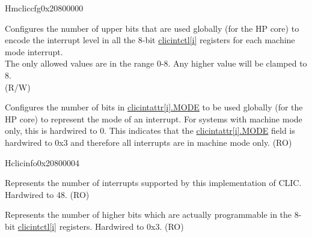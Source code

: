 
\begin{register}{H}{{mcliccfg}}{0x20800000}\label{regdesc:MCLICCFG_REG}
%
%
%
\regnewline%
\begin{regdesc}
\begin{reglist}
\label{fielddesc:MCLICCFG_MNLBITS}\item [MNLBITS] Configures the number of upper bits that are used globally (for the HP core) to encode the interrupt level in all the 8-bit \hyperref[regdesc:MCLICINTCTL_REG_i]{clicintctl[i]} registers for each machine mode interrupt. \\
The only allowed values are in the range 0-8. Any higher value will be clamped to 8. \\
(R/W)
\label{fielddesc:MCLICCFG_NMBITS}\item [NMBITS] Configures the number of bits in \hyperref[fielddesc:MCLICINTATTR_i_MODE]{clicintattr[i].MODE} to be used globally (for the HP core) to represent the mode of an interrupt. For systems with machine mode only, this is hardwired to 0. This indicates that the \hyperref[fielddesc:MCLICINTATTR_i_MODE]{clicintattr[i].MODE} field is hardwired to 0x3 and therefore all interrupts are in machine mode only.  (RO)  \\
\end{reglist}
\end{regdesc}
\end{register}

\begin{register}{H}{{clicinfo}}{0x20800004}\label{regdesc:CLICINFO_REG}
%
%
%
%
\regnewline%
\begin{regdesc}
\begin{reglist}
\label{fielddesc:CLICINFO_NUM_INTERRUPTS}\item [NUM\_INTERRUPTS] Represents the number of interrupts supported by this implementation of CLIC. Hardwired to 48. (RO)
\label{fielddesc:CLICINFO_CLICINTCTLBITS}\item [CLICINTCTLBITS] Represents the number of higher bits which are actually programmable in the 8-bit \hyperref[regdesc:MCLICINTCTL_REG_i]{clicintctl[i]} registers. Hardwired to 0x3. (RO)
\end{reglist}
\end{regdesc}
\end{register}


